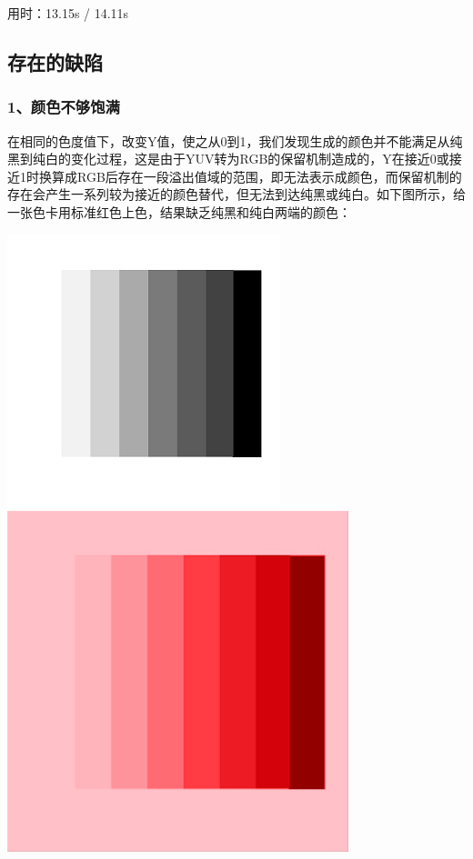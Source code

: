 \documentclass[12pt, a4paper, oneside]{report}
\begin{document}
	
	
	\noindent 用时：13.15s / 14.11s
	
	\subsection{存在的缺陷}
	
	\subsubsection{1、颜色不够饱满}
	
	在相同的色度值下，改变Y值，使之从0到1，我们发现生成的颜色并不能满足从纯黑到纯白的变化过程，这是由于YUV转为RGB的保留机制造成的，Y在接近0或接近1时换算成RGB后存在一段溢出值域的范围，即无法表示成颜色，而保留机制的存在会产生一系列较为接近的颜色替代，但无法到达纯黑或纯白。如下图所示，给一张色卡用标准红色上色，结果缺乏纯黑和纯白两端的颜色：
	
	\centerline{
	\includegraphics[scale=0.53]{colourcard.png}
	\includegraphics[scale=0.7]{colourcard_colorized.png}}
\end{document}
